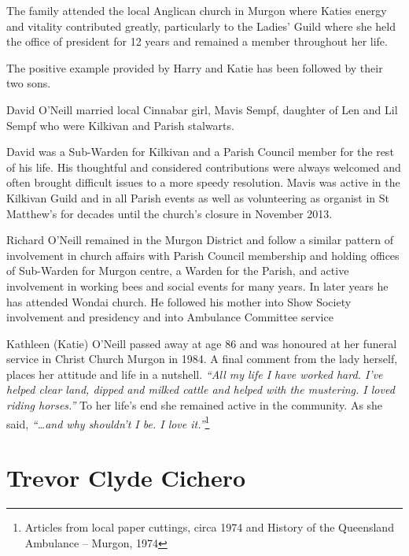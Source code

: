 The family attended the local Anglican church in Murgon where Katies energy and vitality contributed greatly, particularly to the Ladies' Guild where she held the office of president for 12 years and remained a member throughout her life.



The positive example provided by Harry and Katie has been followed by their two sons.



David O'Neill married local Cinnabar girl, Mavis Sempf, daughter of Len and Lil Sempf who were Kilkivan and Parish stalwarts.



David was a Sub-Warden for Kilkivan and a Parish Council member for the rest of his life. His thoughtful and considered contributions were always welcomed and often brought difficult issues to a more speedy resolution. Mavis was active in the Kilkivan Guild and in all Parish events as well as volunteering as organist in St Matthew's for decades until the church's closure in November 2013.



Richard O'Neill remained in the Murgon District and follow a similar pattern of involvement in church affairs with Parish Council membership and holding offices of Sub-Warden for Murgon centre, a Warden for the Parish, and active involvement in working bees and social events for many years. In later years he has attended Wondai church. He followed his mother into Show Society involvement and presidency and into Ambulance Committee service



Kathleen (Katie) O'Neill passed away at age 86 and was honoured at her funeral service in Christ Church Murgon in 1984. A final comment from the lady herself, places her attitude and life in a nutshell. \emph{``All my life I have worked hard. I've helped clear land, dipped and milked cattle and helped with the mustering. I loved riding horses.''} To her life's end she remained active in the community. As she said, \emph{``\ldots and why shouldn't I be. I love it.''}\footnote{Articles from local paper cuttings, circa 1974 and History of the Queensland Ambulance -- Murgon, 1974}


\section{Trevor Clyde Cichero}




